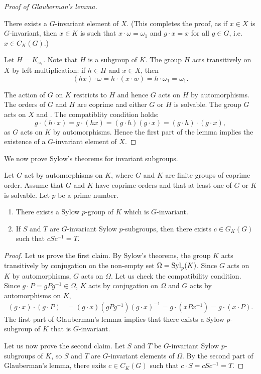 \begin{proof}[Proof of Glauberman's lemma]
	\begin{claim}
		There exists a $G$-invariant element of $X$. (This completes the proof, 
		as if $x\in X$ is $G$-invariant, then $x\in K$ is such that 
		$x\cdot \omega=\omega_1$ and $g\cdot x=x$ for all $g\in G$, i.e.   
		$x\in C_K(G)$.)
	\end{claim}

	Let $H=K_{\omega_1}$. Note that $H$ is a subgroup of $K$. The group 
	$H$ acts transitively on $X$ by left multiplication: if $h\in H$ and $x\in X$, then
	\[
	(hx)\cdot\omega=h\cdot (x\cdot w)=h\cdot\omega_1=\omega_1.
	\]
	
	The action of $G$ on $K$ restricts to $H$ and hence
	$G$ acts on $H$ by automorphisms. The orders
	of $G$ and $H$ are coprime and either $G$ or $H$ is solvable. 
	The group $G$ acts on $X$ 
	and . The compatiblity condition holds:
	\[
	g\cdot (h\cdot x)=g\cdot(hx)=(g\cdot h)(g\cdot x)= (g\cdot h)\cdot (g\cdot x), 
	\]
	as $G$ acts on $K$ by automorphisms. Hence the first part of the 
	lemma implies the existence of a $G$-invariant element of $X$. 
\end{proof}

We now prove Sylow's theorems for invariant 
subgroups.

\begin{theorem}
	Let $G$ act by automorphisms on $K$, where $G$ and $K$ are 
	finite groups of coprime order. Assume
	that $G$ and $K$ have coprime orders and that 
	at least one of $G$ or $K$ is solvable. Let $p$ be a prime number.
	\begin{enumerate}
		\item There exists a Sylow $p$-group of $K$ which is $G$-invariant.
		\item If $S$ and $T$ are $G$-invariant Sylow $p$-subgroups, then there exists 
		$c\in G_K(G)$ such that $cSc^{-1}=T$. 
	\end{enumerate}
\end{theorem}

\begin{proof}
	Let us prove the first claim. By Sylow's theorems, the group $K$ acts transitively by conjugation
	on the non-empty set 
	$\Omega=\mathrm{Syl}_p(K)$. Since $G$ acts on $K$ by automorphisms, $G$ acts on $\Omega$. Let us check the
	compatibility condition. Since $g\cdot P=gPg^{-1}\in\Omega$, $K$ acts by conjugation
	on $\Omega$ and $G$ acts by automorphisms on $K$, 
	\begin{align*}
	(g\cdot x)\cdot (g\cdot P) &= (g\cdot x)(gPg^{-1})(g\cdot x)^{-1}
	=g\cdot (xPx^{-1})=g\cdot (x\cdot P).
	\end{align*}
	The first part of Glauberman's lemma implies that there exists a Sylow $p$-subgroup 
	of $K$ that is $G$-invariant. 
	
	Let us now prove the second claim. 
	Let $S$ and $T$ be $G$-invariant Sylow $p$-subgroups of $K$, so $S$ and $T$ are $G$-invariant elements of $\Omega$. 
	By the second part of Glauberman's lemma, 
	there exits $c\in C_K(G)$ such that $c\cdot S=cSc^{-1}=T$. 
\end{proof}

